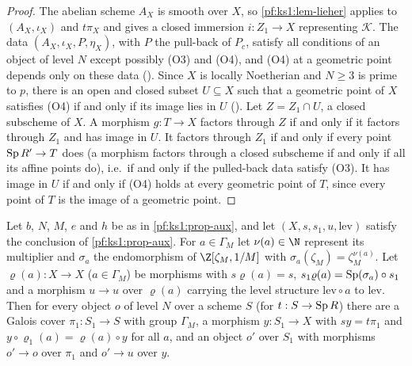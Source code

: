 \begin{proof}
The abelian scheme $A_X$ is smooth over $X$, so \cref{pf:ks1:lem-lieher} applies to $(A_X,\iota_X)$ and $t\pi_X$ and gives a closed immersion
$i:Z_1\to X$ representing $\mathcal K$. The data $(A_X,\iota_X,P,\eta_X)$, with $P$ the pull-back of $P_c$, satisfy all conditions of an object of level
$N$ except possibly (O3) and (O4), and (O4) at a geometric point depends only on these data
(). Since $X$ is locally Noetherian and $N\ge3$ is prime to $p$, there is
an open and closed subset $U\subseteq X$ such that a geometric point of $X$ satisfies (O4) if and only if its image lies in $U$
(). Let $Z=Z_1\cap U$, a closed subscheme of $X$. A morphism $g:T\to X$ factors through
$Z$ if and only if it factors through $Z_1$ and has image in $U$. It factors through $Z_1$ if and only if every point $\operatorname{Sp} R'\to T$ does (a
morphism factors through a closed subscheme if and only if all its affine points do), i.e.\ if and only if the pulled-back data satisfy (O3). It
has image in $U$ if and only if (O4) holds at every geometric point of $T$, since every point of $T$ is the image of a geometric point.
\end{proof}

\begin{proposition}\label{pf:ks1:prop-galcover}
Let $b$, $N$, $M$, $e$ and $h$ be as in \cref{pf:ks1:prop-aux}, and let $(X,s,s_1,u,\mathrm{lev})$ satisfy the conclusion of \cref{pf:ks1:prop-aux}.
For $a\in\Gamma_M$ let $\nu(a)\in\N$ represent its multiplier and $\sigma_a$ the endomorphism of $\Z[\zeta_M,1/M]$ with
$\sigma_a(\zeta_M)=\zeta_M^{\nu(a)}$. Let $\varrho(a):X\to X$ ($a\in\Gamma_M$) be morphisms with $s\varrho(a)=s$,
$s_1\varrho(a)=\operatorname{Sp}(\sigma_a)\circ s_1$ and a morphism $u\to u$ over $\varrho(a)$ carrying the level structure $\mathrm{lev}\circ a$ to
$\mathrm{lev}$. Then for every object $o$ of level $N$ over a scheme $S$ (for $t:S\to\operatorname{Sp} R$) there are a Galois cover $\pi_1:S_1\to S$ with
group $\Gamma_M$, a morphism $y:S_1\to X$ with $sy=t\pi_1$ and $y\circ\varrho_1(a)=\varrho(a)\circ y$ for all $a$, and an object $o'$ over $S_1$ with
morphisms $o'\to o$ over $\pi_1$ and $o'\to u$ over $y$.
\end{proposition}

